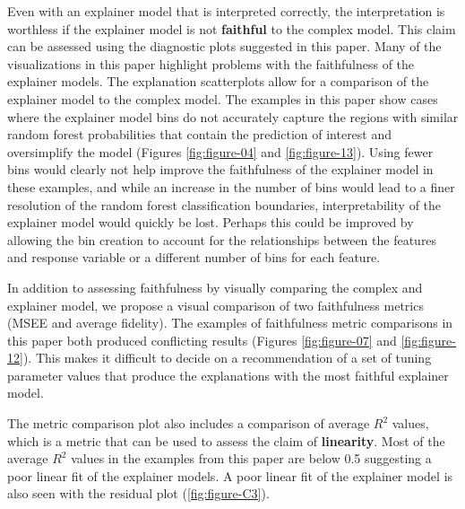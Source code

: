 \documentclass[AMS,STIX2COL]{WileyNJD-v2}\usepackage[]{graphicx}\usepackage[]{color}
\begin{document}
Even with an explainer model that is interpreted correctly, the interpretation is worthless if the explainer model is not \textbf{faithful} to the complex model. This claim can be assessed using the diagnostic plots suggested in this paper. Many of the visualizations in this paper highlight problems with the faithfulness of the explainer models. The explanation scatterplots allow for a comparison of the explainer model to the complex model. The examples in this paper show cases where the explainer model bins do not accurately capture the regions with similar random forest probabilities that contain the prediction of interest and oversimplify the model (Figures \ref{fig:figure-04} and \ref{fig:figure-13}). Using fewer bins would clearly not help improve the faithfulness of the explainer model in these examples, and while an increase in the number of bins would lead to a finer resolution of the random forest classification boundaries, interpretability of the explainer model would quickly be lost. Perhaps this could be improved by allowing the bin creation to account for the relationships between the features and response variable or a different number of bins for each feature.

In addition to assessing faithfulness by visually comparing the complex and explainer model, we propose a visual comparison of two faithfulness metrics (MSEE and average fidelity). The examples of faithfulness metric comparisons in this paper both produced conflicting results (Figures \ref{fig:figure-07} and \ref{fig:figure-12}). This makes it difficult to decide on a recommendation of a set of tuning parameter values that produce the explanations with the most faithful explainer model.

The metric comparison plot also includes a comparison of average $R^2$ values, which is a metric that can be used to assess the claim of \textbf{linearity}. Most of the average $R^2$ values in the examples from this paper are below 0.5 suggesting a poor linear fit of the explainer models. A poor linear fit of the explainer model is also seen with the residual plot (\autoref{fig:figure-C3}).
\end{document}
